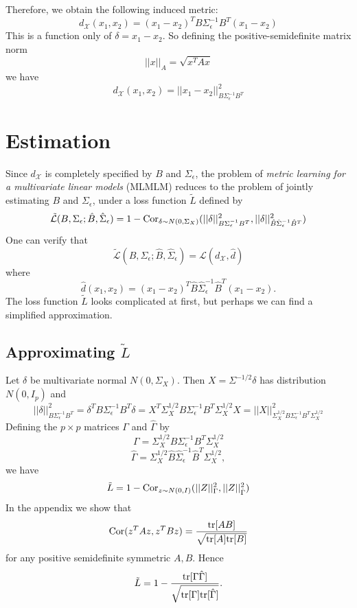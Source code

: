\documentclass[12pt]{article}
\begin{document}
Therefore, we obtain the following induced metric:
\[
d_\mathcal{X}(x_1,x_2) = (x_1-x_2)^T B \Sigma_\epsilon^{-1} B^T (x_1 - x_2)
\]
This is a function only of $\delta = x_1 - x_2$.
So defining the
positive-semidefinite matrix norm
\[
||x||_A = \sqrt{x^T A x}
\]
we have
\[
d_\mathcal{X}(x_1,x_2) = ||x_1 - x_2||^2_{B\Sigma_\epsilon^{-1}B^T}
\]

\section{Estimation}

Since $d_\mathcal{X}$ is completely specified by $B$ and
$\Sigma_\epsilon$, the problem of \emph{metric
learning for a multivariate linear models} (MLMLM) reduces to the
problem of jointly estimating $B$ and $\Sigma_\epsilon$, under a loss
function $\tilde{L}$ defined by
\[
\tilde{\mathcal{L}}(B, \Sigma_\epsilon; \hat{B}, \hat{\Sigma}_\epsilon) = 
1 - \text{Cor}_{\delta \sim N(0, \Sigma_X)}(||\delta||^2_{B\Sigma_\epsilon^{-1}B^T},
||\delta||^2_{\hat{B}\hat{\Sigma}_\epsilon^{-1}\hat{B}^T})
\]
One can verify that
\[
\tilde{\mathcal{L}}(B, \Sigma_\epsilon; \hat{B}, \hat{\Sigma}_\epsilon) 
= \mathcal{L}(d_\mathcal{X}, \hat{d})
\]
where
\[
\hat{d}(x_1, x_2) =  (x_1-x_2)^T \hat{B} \hat{\Sigma}_\epsilon^{-1} \hat{B}^T (x_1 - x_2).
\]
The loss function $\tilde{L}$ looks complicated at first,
but perhaps we can find a simplified approximation.

\subsection{Approximating $\tilde{L}$}

Let $\delta$ be multivariate normal $N(0, \Sigma_X)$.
Then $X = \Sigma^{-1/2}\delta$ has distribution $N(0, I_p)$
and
\[
||\delta||^2_{B\Sigma_\epsilon^{-1}B^T}
= \delta^T B\Sigma_\epsilon^{-1}B^T \delta
= X^T \Sigma_X^{1/2}B\Sigma_\epsilon^{-1}B^T \Sigma_X^{1/2} X
= ||X||^2_{\Sigma_X^{1/2}B\Sigma_\epsilon^{-1}B^T \Sigma_X^{1/2}}
\]
Defining the $p \times p$ matrices $\Gamma$ and $\hat{\Gamma}$ by
\[\Gamma = \Sigma_X^{1/2}B\Sigma_\epsilon^{-1}B^T \Sigma_X^{1/2}\]
\[\hat{\Gamma}
 = \Sigma_X^{1/2}\hat{B}\hat{\Sigma}_\epsilon^{-1}\hat{B}^T \Sigma_X^{1/2},\]
we have
\[
\tilde{L} = 
1 - \text{Cor}_{z \sim N(0, I)}(||Z||^2_\Gamma, ||Z||^2_{\hat{\Gamma}})
\]
In the appendix we show that
\[
\text{Cor}(z^T A z, z^T B z) = \frac{\text{tr}[AB]}{\sqrt{\text{tr}[A]\text{tr}[B]}}
\]
for any positive semidefinite symmetric $A, B$.
Hence
\[
\tilde{L} = 1 - \frac{\text{tr}[\Gamma\hat{\Gamma}]}{\sqrt{\text{tr}[\Gamma]\text{tr}[\hat{\Gamma}]}}.
\]
\end{document}
